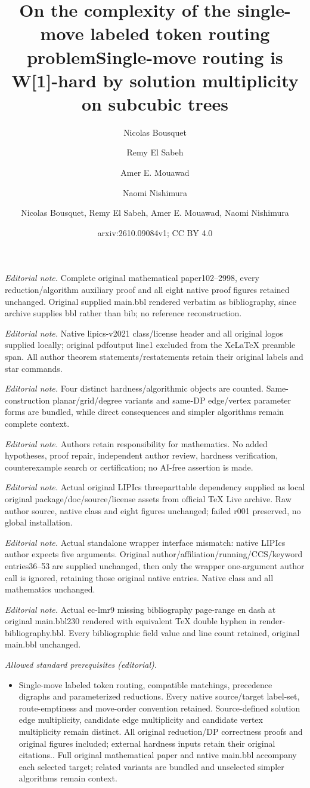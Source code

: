 \documentclass[a4paper,USenglish,thm-restate]{lipics-v2021}
\title{On the complexity of the single-move labeled token routing problem}
\author{Nicolas Bousquet}{CNRS, Univ.\ Lyon, Universit\'e Lyon 1, INSA Lyon, LIRIS UMR CNRS 5205, F-69621 Villeurbanne, France}{nicolas.bousquet@cnrs.fr}{https://orcid.org/0000-0003-0170-0503}{}
\author{Remy {El Sabeh}}{David R. Cheriton School of Computer Science, University of Waterloo, Waterloo, ON, Canada}{relsabeh@uwaterloo.ca}{https://orcid.org/0000-0002-3786-4035}{}
\author{Amer E. Mouawad}{American University of Beirut, Beirut, Lebanon \and David R. Cheriton School of Computer Science, University of Waterloo, Waterloo, ON, Canada}{aa368@aub.edu.lb}{}{}
\author{Naomi Nishimura}{David R. Cheriton School of Computer Science, University of Waterloo, Waterloo, ON, Canada}{nishi@uwaterloo.ca}{}{}
\title{Single-move routing is W[1]-hard by solution multiplicity on subcubic trees}
\author{Nicolas Bousquet, Remy El Sabeh, Amer E. Mouawad, Naomi Nishimura}
\date{arxiv:2610.09084v1; CC BY 4.0}
\theoremstyle{problemstyle}
\begin{document}
\maketitle
\noindent\textit{Editorial note.} Complete original mathematical paper102--2998, every reduction/algorithm auxiliary proof and all eight native proof figures retained unchanged. Original supplied main.bbl rendered verbatim as bibliography, since archive supplies bbl rather than bib; no reference reconstruction.\par\medskip
\noindent\textit{Editorial note.} Native lipics-v2021 class/license header and all original logos supplied locally; original pdfoutput line1 excluded from the XeLaTeX preamble span. All author theorem statements/restatements retain their original labels and star commands.\par\medskip
\noindent\textit{Editorial note.} Four distinct hardness/algorithmic objects are counted. Same-construction planar/grid/degree variants and same-DP edge/vertex parameter forms are bundled, while direct consequences and simpler algorithms remain complete context.\par\medskip
\noindent\textit{Editorial note.} Authors retain responsibility for mathematics. No added hypotheses, proof repair, independent author review, hardness verification, counterexample search or certification; no AI-free assertion is made.\par\medskip
\noindent\textit{Editorial note.} Actual original LIPIcs threeparttable dependency supplied as local original package/doc/source/license assets from official TeX Live archive. Raw author source, native class and eight figures unchanged; failed r001 preserved, no global installation.\par\medskip
\noindent\textit{Editorial note.} Actual standalone wrapper interface mismatch: native LIPIcs author expects five arguments. Original author/affiliation/running/CCS/keyword entries36--53 are supplied unchanged, then only the wrapper one-argument author call is ignored, retaining those original native entries. Native class and all mathematics unchanged.\par\medskip
\noindent\textit{Editorial note.} Actual ec-lmr9 missing bibliography page-range en dash at original main.bbl230 rendered with equivalent TeX double hyphen in render-bibliography.bbl. Every bibliographic field value and line count retained, original main.bbl unchanged.\par\medskip
\noindent\textit{Allowed standard prerequisites (editorial).}\begin{itemize}
\item Single-move labeled token routing, compatible matchings, precedence digraphs and parameterized reductions. Every native source/target label-set, route-emptiness and move-order convention retained. Source-defined solution edge multiplicity, candidate edge multiplicity and candidate vertex multiplicity remain distinct. All original reduction/DP correctness proofs and original figures included; external hardness inputs retain their original citations.. Full original mathematical paper and native main.bbl accompany each selected target; related variants are bundled and unselected simpler algorithms remain context.
\end{itemize}\medskip
\end{document}
